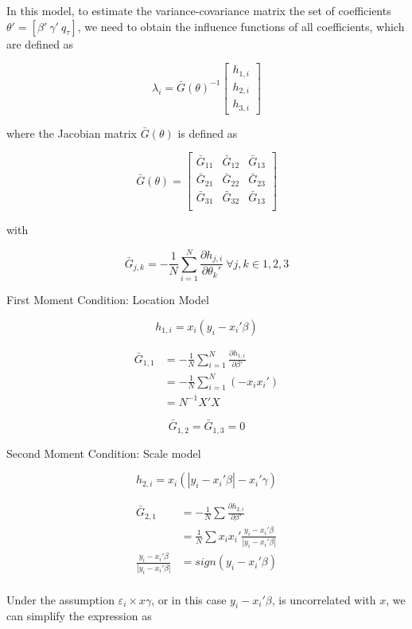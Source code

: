 \documentclass[
  authoryear,
  review,
  1p]{elsarticle}
\begin{document}
In this model, to estimate the variance-covariance matrix the set of
coefficients \(\theta'=[\beta' \ \gamma' \ q_\tau]\), we need to obtain
the influence functions of all coefficients, which are defined as

\[\lambda_i = \bar G(\theta)^{-1}
\begin{bmatrix}
h_{1,i} \\
h_{2,i} \\
h_{3,i}
\end{bmatrix}
\]

where the Jacobian matrix \(\bar G(\theta)\) is defined as

\[\bar G(\theta) = \begin{bmatrix}
\bar G_{11} & \bar G_{12} & \bar G_{13} \\
\bar G_{21} & \bar G_{22} & \bar G_{23} \\
\bar G_{31} & \bar G_{32} & \bar G_{13} \\
\end{bmatrix}
\]

with

\[\bar G_{j,k} = - \frac 1 N \sum_{i=1}^N \frac{\partial h_{j,i}}{\partial \theta_k'} \ \forall j,k \in 1,2,3
\]

First Moment Condition: Location Model

\[h_{1,i}=x_i(y_i-x_i'\beta)\]

\[\begin{aligned}
\bar G_{1,1} &=- \frac{1}{N} \sum_{i=1}^N \frac{\partial h_{1,i}}{\partial \beta'} \\
             &=- \frac{1}{N} \sum_{i=1}^N (-x_i x_i') \\
             &= N^{-1} X'X
\end{aligned}
\]

\[
\bar G_{1,2} = \bar G_{1,3} = 0
\]

Second Moment Condition: Scale model

\[h_{2,i}=x_i(|y_i-x_i'\beta|-x_i'\gamma)\]

\[\begin{aligned}
\bar G_{2,1} &= -\frac{1}{N} \sum \frac{\partial h_{2,i}}{\partial \beta'} \\
             &=  \frac{1}{N} \sum x_i x_i' \frac{y_i-x_i'\beta}{|y_i-x_i'\beta|} \\
\frac{y_i-x_i'\beta}{|y_i-x_i'\beta|} &= sign(y_i-x_i'\beta) \\            
\end{aligned}
\]

Under the assumption \(\varepsilon_i \times x\gamma\), or in this case
\(y_i-x_i'\beta\), is uncorrelated with \(x\), we can simplify the
expression as
\end{document}
